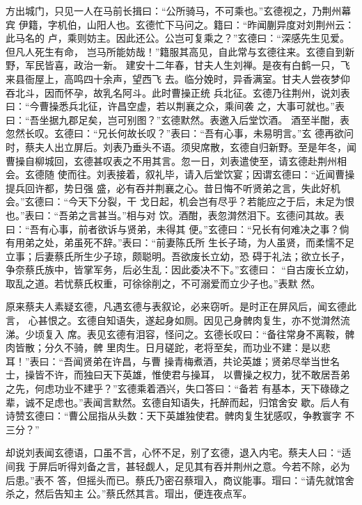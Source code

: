 方出城门，只见一人在马前长揖曰：“公所骑马，不可乘也。”玄德视之，乃荆州幕宾
伊籍，字机伯，山阳人也。玄德忙下马问之。籍曰：“昨闻蒯异度对刘荆州云：此马名的
卢，乘则妨主。因此还公。公岂可复乘之？”玄德曰：“深感先生见爱。但凡人死生有命，
岂马所能妨哉！”籍服其高见，自此常与玄德往来。玄德自到新野，军民皆喜，政治一新。
建安十二年春，甘夫人生刘禅。是夜有白鹤一只，飞来县衙屋上，高鸣四十余声，望西飞
去。临分娩时，异香满室。甘夫人尝夜梦仰吞北斗，因而怀孕，故乳名阿斗。此时曹操正统
兵北征。玄德乃往荆州，说刘表曰：“今曹操悉兵北征，许昌空虚，若以荆襄之众，乘间袭
之，大事可就也。”表曰：“吾坐据九郡足矣，岂可别图？”玄德默然。表邀入后堂饮酒。
酒至半酣，表忽然长叹。玄德曰：“兄长何故长叹？”表曰：“吾有心事，未易明言。”玄
德再欲问时，蔡夫人出立屏后。刘表乃垂头不语。须臾席散，玄德自归新野。至是年冬，闻
曹操自柳城回，玄德甚叹表之不用其言。忽一日，刘表遣使至，请玄德赴荆州相会。玄德随
使而往。刘表接着，叙礼毕，请入后堂饮宴；因谓玄德曰：“近闻曹操提兵回许都，势日强
盛，必有吞并荆襄之心。昔日悔不听贤弟之言，失此好机会。”玄德曰：“今天下分裂，干
戈日起，机会岂有尽乎？若能应之于后，未足为恨也。”表曰：“吾弟之言甚当。”相与对
饮。酒酣，表忽潸然泪下。玄德问其故。表曰：“吾有心事，前者欲诉与贤弟，未得其
便。”玄德曰：“兄长有何难决之事？倘有用弟之处，弟虽死不辞。”表曰：“前妻陈氏所
生长子琦，为人虽贤，而柔懦不足立事；后妻蔡氏所生少子琼，颇聪明。吾欲废长立幼，恐
碍于礼法；欲立长子，争奈蔡氏族中，皆掌军务，后必生乱：因此委决不下。”玄德曰：
“自古废长立幼，取乱之道。若忧蔡氏权重，可徐徐削之，不可溺爱而立少子也。”表默
然。

原来蔡夫人素疑玄德，凡遇玄德与表叙论，必来窃听。是时正在屏风后，闻玄德此言，
心甚恨之。玄德自知语失，遂起身如厕。因见己身髀肉复生，亦不觉潸然流涕。少顷复入
席。表见玄德有泪容，怪问之。玄德长叹曰：“备往常身不离鞍，髀肉皆散；分久不骑，髀
里肉生。日月磋跎，老将至矣，而功业不建：是以悲耳！”表曰：“吾闻贤弟在许昌，与曹
操青梅煮酒，共论英雄；贤弟尽举当世名士，操皆不许，而独曰天下英雄，惟使君与操耳，
以曹操之权力，犹不敢居吾弟之先，何虑功业不建乎？”玄德乘着酒兴，失口答曰：“备若
有基本，天下碌碌之辈，诚不足虑也。”表闻言默然。玄德自知语失，托醉而起，归馆舍安
歇。后人有诗赞玄德曰：“曹公屈指从头数：天下英雄独使君。髀肉复生犹感叹，争教寰字
不三分？”

却说刘表闻玄德语，口虽不言，心怀不足，别了玄德，退入内宅。蔡夫人曰：“适间我
于屏后听得刘备之言，甚轻觑人，足见其有吞并荆州之意。今若不除，必为后患。”表不
答，但摇头而已。蔡氏乃密召蔡瑁入，商议能事。瑁曰：“请先就馆舍杀之，然后告知主
公。”蔡氏然其言。瑁出，便连夜点军。

